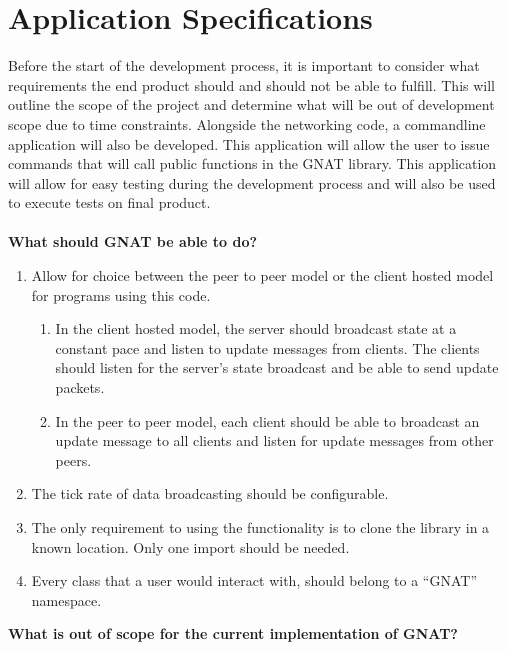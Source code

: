\section{Application Specifications}
Before the start of the development process, it is important to consider what requirements the end product should and should not be able to fulfill. This will outline the scope of the project and determine what will be out of development scope due to time constraints. Alongside the networking code, a commandline application will also be developed. This application will allow the user to issue commands that will call public functions in the GNAT library. This application will allow for easy testing during the development process and will also be used to execute tests on final product.
\\
\\
\textbf{What should GNAT be able to do?}
\begin{enumerate}
\item Allow for choice between the peer to peer model or the client hosted model for programs using this code.
  \begin{enumerate}
  \item In the client hosted model, the server should broadcast state at a constant pace and listen to update messages from clients. The clients should listen for the server's state broadcast and be able to send update packets.
    \item In the peer to peer model, each client should be able to broadcast an update message to all clients and listen for update messages from other peers.
  \end{enumerate}
\item The tick rate of data broadcasting should be configurable.
\item The only requirement to using the functionality is to clone the library in a known location. Only one import should be needed.
\item Every class that a user would interact with, should belong to a ``GNAT'' namespace.
\end{enumerate}
\textbf{What is out of scope for the current implementation of GNAT?}
